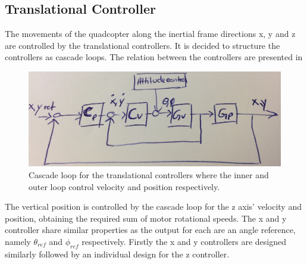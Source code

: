 \subsection{Translational Controller}
The movements of the quadcopter along the inertial frame directions x, y and z are controlled by the translational controllers. It is decided to structure the controllers as cascade loops. The relation between the controllers are presented in 


\begin{figure}[H]
	\centering
	\includegraphics[scale=0.07]{figures/cascade_paper.png}
	\caption{Cascade loop for the translational controllers where the inner and outer loop control velocity and position respectively.}
	\label{fig:cascade}
\end{figure}
The vertical position is controlled by the cascade loop for the z axis' velocity and position, obtaining the required sum of motor rotational speeds. 
The x and y controller share similar properties as the output for each are an angle reference, namely $\theta_{ref}$ and $\phi_{ref}$ respectively.
Firstly the x and y controllers are designed similarly followed by an individual design for the z controller.\\ 


